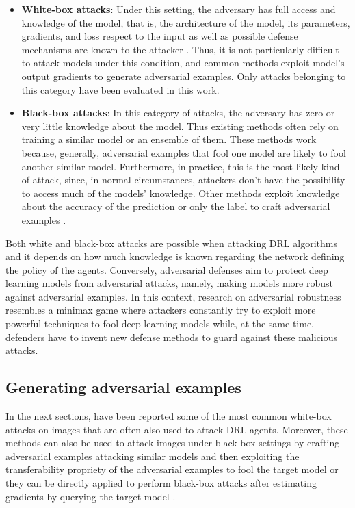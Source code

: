 \begin{itemize}
    \item \textbf{White-box attacks}: Under this setting, the adversary has full access and knowledge of the model, that is, the architecture of the model, its parameters, gradients, and loss respect to the input as well as possible defense mechanisms are known to the attacker \cite{goodfellow2014explaining}. Thus, it is not particularly difficult to attack models under this condition, and common methods exploit model's output gradients to generate adversarial examples. Only attacks belonging to this category have been evaluated in this work.
    \item \textbf{Black-box attacks}: In this category of attacks, the adversary has zero or very little knowledge about the model. Thus existing methods often rely on training a similar model or an ensemble of them. These methods work because, generally, adversarial examples that fool one model are likely to fool another similar model. Furthermore, in practice, this is the most likely kind of attack, since, in normal circumstances, attackers don't have the possibility to access much of the models' knowledge. Other methods exploit knowledge about the accuracy of the prediction or only the label to craft adversarial examples \cite{wiel2017decisionbased}.
\end{itemize}
Both white and black-box attacks are possible when attacking DRL algorithms and it depends on how much knowledge is known regarding the network defining the policy of the agents. Conversely, adversarial defenses aim to protect deep learning models from adversarial attacks, namely, making models more robust against adversarial examples. In this context, research on adversarial robustness resembles a minimax game where attackers constantly try to exploit more powerful techniques to fool deep learning models while, at the same time, defenders have to invent new defense methods to guard against these malicious attacks.

\subsection{Generating adversarial examples}
In the next sections, have been reported some of the most common white-box attacks on images that are often also used to attack DRL agents. Moreover, these methods can also be used to attack images under black-box settings by crafting adversarial examples attacking similar models and then exploiting the transferability propriety of the adversarial examples to fool the target model \cite{dong2017boosting} or they can be directly applied to perform black-box attacks after estimating gradients by querying the target model \cite{Chen_2017}.


